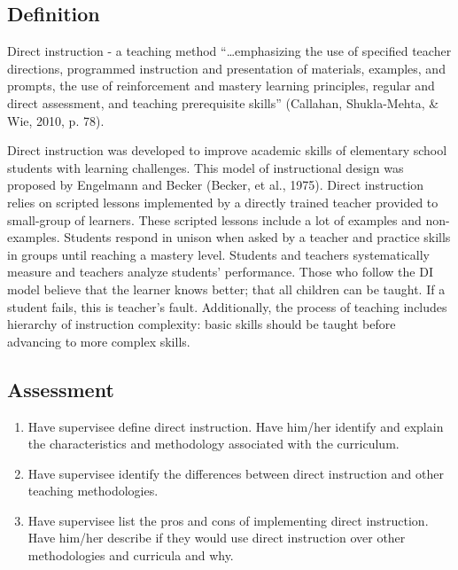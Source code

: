 \subsection{Definition}
Direct instruction - a teaching method ``…emphasizing the use of specified teacher directions, programmed instruction and presentation of materials, examples, and prompts, the use of reinforcement and mastery learning principles, regular and direct assessment, and teaching prerequisite skills'' (Callahan, Shukla-Mehta, \& Wie, 2010, p. 78).

Direct instruction was developed to improve academic skills of elementary school students with learning challenges. This model of instructional design was proposed by Engelmann and Becker (Becker, et al., 1975). Direct instruction relies on scripted lessons implemented by a directly trained teacher provided to small-group of learners.  These scripted lessons include a lot of examples and non-examples. Students respond in unison when asked by a teacher and practice skills in groups until reaching a mastery level. Students and teachers systematically measure and teachers analyze students' performance. Those who follow the DI model believe that the learner knows better; that all children can be taught. If a student fails, this is teacher's fault. Additionally, the process of teaching includes hierarchy of instruction complexity: basic skills should be taught before advancing to more complex skills. 
%
\subsection{Assessment}
\begin{enumerate}
\item Have supervisee define direct instruction. Have him/her identify and explain the characteristics and methodology associated with the curriculum.
\item Have supervisee identify the differences between direct instruction and other teaching methodologies.
\item Have supervisee list the pros and cons of implementing direct instruction. Have him/her describe if they would use direct instruction over other methodologies and curricula and why.
%
\end{enumerate}
%
